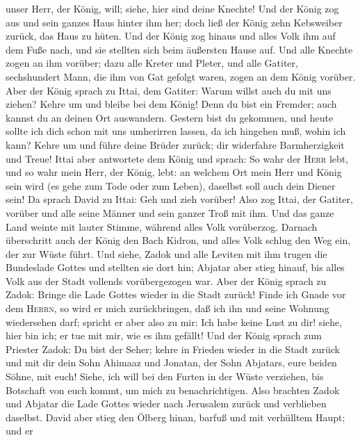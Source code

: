unser Herr, der König, will; siehe, hier sind deine Knechte!
 Und der König zog aus und sein ganzes Haus hinter ihm
her; doch ließ der König zehn Kebsweiber zurück, das Haus zu hüten.
 Und der König zog hinaus und alles Volk ihm auf dem Fuße
nach, und sie stellten sich beim äußersten Hause auf. 
Und alle Knechte zogen an ihm vorüber; dazu alle Kreter und Pleter, und
alle Gatiter, sechshundert Mann, die ihm von Gat gefolgt waren, zogen an
dem König vorüber.  Aber der König sprach zu Ittai, dem
Gatiter: Warum willst auch du mit uns ziehen? Kehre um und bleibe bei
dem König! Denn du bist ein Fremder; auch kannst du an deinen Ort
auswandern.  Gestern bist du gekommen, und heute sollte
ich dich schon mit uns umherirren lassen, da ich hingehen muß, wohin ich
kann? Kehre um und führe deine Brüder zurück; dir widerfahre
Barmherzigkeit und Treue!  Ittai aber antwortete dem
König und sprach: So wahr der \textsc{Herr} lebt, und so wahr mein Herr,
der König, lebt: an welchem Ort mein Herr und König sein wird (es gehe
zum Tode oder zum Leben), daselbst soll auch dein Diener sein!
 Da sprach David zu Ittai: Geh und zieh vorüber! Also zog
Ittai, der Gatiter, vorüber und alle seine Männer und sein ganzer Troß
mit ihm.  Und das ganze Land weinte mit lauter Stimme,
während alles Volk vorüberzog. Darnach überschritt auch der König den
Bach Kidron, und alles Volk schlug den Weg ein, der zur Wüste führt.
 Und siehe, Zadok und alle Leviten mit ihm trugen die
Bundeslade Gottes und stellten sie dort hin; Abjatar aber stieg hinauf,
bis alles Volk aus der Stadt vollends vorübergezogen war.
 Aber der König sprach zu Zadok: Bringe die Lade Gottes
wieder in die Stadt zurück! Finde ich Gnade vor dem \textsc{Herrn}, so
wird er mich zurückbringen, daß ich ihn und seine Wohnung wiedersehen
darf;  spricht er aber also zu mir: Ich habe keine Lust
zu dir! siehe, hier bin ich; er tue mit mir, wie es ihm gefällt!
 Und der König sprach zum Priester Zadok: Du bist der
Seher; kehre in Frieden wieder in die Stadt zurück und mit dir dein Sohn
Ahimaaz und Jonatan, der Sohn Abjatars, eure beiden Söhne, mit euch!
 Siehe, ich will bei den Furten in der Wüste verziehen,
bis Botschaft von euch kommt, um mich zu benachrichtigen.
 Also brachten Zadok und Abjatar die Lade Gottes wieder
nach Jerusalem zurück und verblieben daselbst.  David
aber stieg den Ölberg hinan, barfuß und mit verhülltem Haupt; und er
